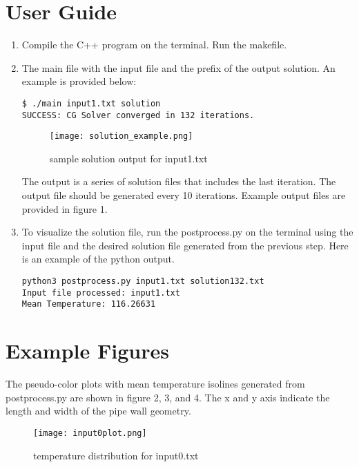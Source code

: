 \documentclass{article}
\begin{document}
\section{User Guide}
\begin{enumerate}
\item Compile the C++ program on the terminal. Run the makefile.

\item The main file with the input file and the prefix of the output solution. An example is provided below:

 \begin{verbatim}
$ ./main input1.txt solution
SUCCESS: CG Solver converged in 132 iterations.
\end{verbatim}

\begin{figure}[]
\centering
\texttt{[image: solution\_example.png]}
\caption{\label{fig:frog}sample solution output for input1.txt}
\end{figure}

The output is a series of solution files that includes the last iteration. The output file should be generated every 10 iterations. Example output files are provided in figure 1.

\item To visualize the solution file, run the postprocess.py on the terminal using the input file and the desired solution file generated from the previous step. Here is an example of the python output.

 \begin{verbatim}
python3 postprocess.py input1.txt solution132.txt
Input file processed: input1.txt
Mean Temperature: 116.26631
\end{verbatim}


\end{enumerate}


\section{Example Figures}

The pseudo-color plots with mean temperature isolines generated from postprocess.py are shown in figure 2, 3, and 4. The x and y axis indicate the length and width of the pipe wall geometry. 

\begin{figure}[]
\centering
\texttt{[image: input0plot.png]}
\caption{\label{fig:frog}temperature distribution for input0.txt}
\end{figure}
\end{document}
